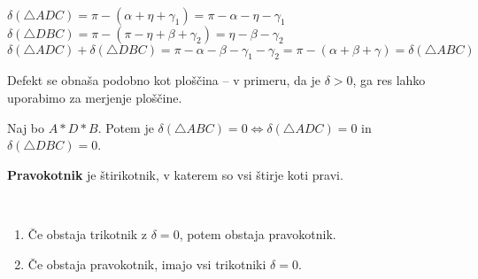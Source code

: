 \begin{dokaz}
            \\ $\delta(\triangle ADC)=\pi-(\alpha+\eta +\gamma_1)=\pi-\alpha-\eta-\gamma_1$
            \\ $\delta(\triangle DBC)=\pi-(\pi-\eta+\beta +\gamma_2)=\eta-\beta-\gamma_2$
            \\ $\delta(\triangle ADC)+\delta(\triangle DBC)=\pi-\alpha-\beta-\gamma_1-\gamma_2= \pi-(\alpha+\beta+\gamma)=\delta(\triangle ABC)$
        \end{dokaz}

    \begin{opomba}
        Defekt se obnaša podobno kot ploščina -- v primeru, da je $\delta>0$, ga res lahko uporabimo za merjenje ploščine.
    \end{opomba}

    \begin{posledica}
        Naj bo $A\ast D\ast B$. Potem je $\delta(\triangle ABC)=0 \Leftrightarrow \delta(\triangle ADC)=0$ in $\delta(\triangle DBC)=0$.
    \end{posledica}

    \begin{definicija}
        \textbf{Pravokotnik} je štirikotnik, v katerem so vsi štirje koti pravi.
    \end{definicija}

    \begin{izrek}
        ~
        \begin{enumerate}
            \item Če obstaja trikotnik z $\delta=0$, potem obstaja pravokotnik.
            \item Če obstaja pravokotnik, imajo vsi trikotniki $\delta=0$.
        \end{enumerate}
    \end{izrek}

